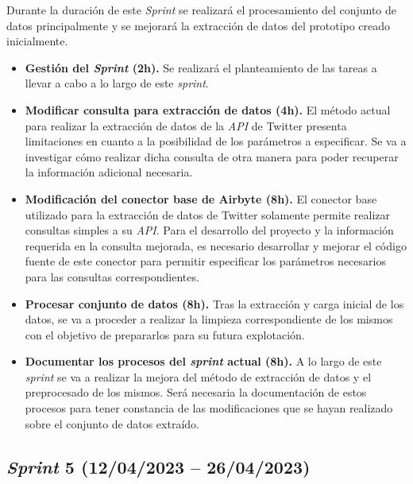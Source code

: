 Durante la duración de este \textit{Sprint} se realizará el procesamiento del conjunto de datos principalmente y se mejorará la extracción de datos del prototipo creado inicialmente.

\begin{itemize}

    \item \textbf{Gestión del \textit{Sprint} (2h).} Se realizará el planteamiento de las tareas a llevar a cabo a lo largo de este \textit{sprint}.

    \item \textbf{Modificar consulta para extracción de datos (4h).} El método actual para realizar la extracción de datos de la \textit{API} de Twitter presenta limitaciones en cuanto a la posibilidad de los parámetros a especificar. Se va a investigar cómo realizar dicha consulta de otra manera para poder recuperar la información adicional necesaria.

    \item \textbf{Modificación del conector base de Airbyte (8h).} El conector base utilizado para la extracción de datos de Twitter solamente permite realizar consultas simples a su \textit{API}. Para el desarrollo del proyecto y la información requerida en la consulta mejorada, es necesario desarrollar y mejorar el código fuente de este conector para permitir especificar los parámetros necesarios para las consultas correspondientes.

    \item \textbf{Procesar conjunto de datos (8h).} Tras la extracción y carga inicial de los datos, se va a proceder a realizar la limpieza correspondiente de los mismos con el objetivo de prepararlos para su futura explotación.

    \item \textbf{Documentar los procesos del \textit{sprint} actual (8h).} A lo largo de este \textit{sprint} se va a realizar la mejora del método de extracción de datos y el preprocesado de los mismos. Será necesaria la documentación de estos procesos para tener constancia de las modificaciones que se hayan realizado sobre el conjunto de datos extraído.

\end{itemize}



\subsection{\textit{Sprint} 5 (12/04/2023 -- 26/04/2023)}

